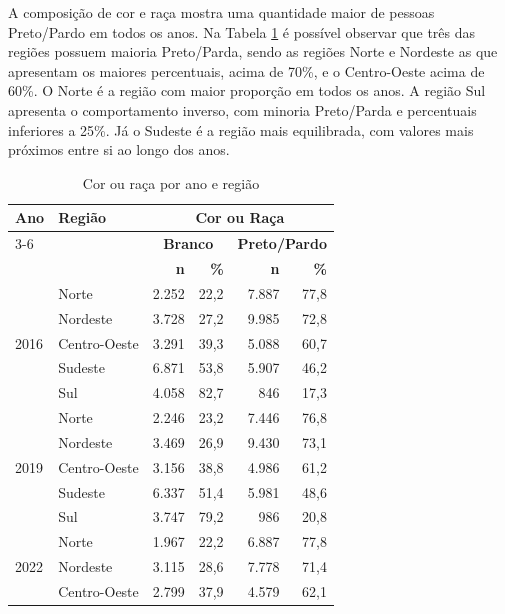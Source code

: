 \documentclass[12pt,a4paper,header]{abnt}
\begin{document}
\FloatBarrier
A composição de cor e raça mostra uma quantidade maior de pessoas Preto/Pardo em todos os anos. Na Tabela \ref{tab:cor_raça} é possível observar que três das regiões possuem maioria Preto/Parda, sendo as regiões Norte e Nordeste as que apresentam os maiores percentuais, acima de 70\%, e o Centro-Oeste acima de 60\%. O Norte é a região com maior proporção em todos os anos. A região Sul apresenta o comportamento inverso, com minoria Preto/Parda e percentuais inferiores a 25\%. Já o Sudeste é a região mais equilibrada, com valores mais próximos entre si ao longo dos anos.
\begin{table}[ht]
\centering
\caption{Cor ou raça por ano e região}
\label{tab:cor_raça}
\begin{tabular}{llrrrr}
\toprule
\multirow{3}{*}{\textbf{Ano}} & \multirow{3}{*}{\textbf{Região}} & \multicolumn{4}{c}{\textbf{Cor ou Raça}} \\
\cmidrule(lr){3-6}
& & \multicolumn{2}{c}{\textbf{Branco}} & \multicolumn{2}{c}{\textbf{Preto/Pardo}} \\
& & \textbf{n} & \textbf{\%} & \textbf{n} & \textbf{\%} \\
\midrule
\multirow{5}{*}{2016} & Norte        & 2.252 & 22,2 & 7.887 & 77,8 \\
                      & Nordeste     & 3.728 & 27,2 & 9.985 & 72,8 \\
                      & Centro-Oeste & 3.291 & 39,3 & 5.088 & 60,7 \\
                      & Sudeste      & 6.871 & 53,8 & 5.907 & 46,2 \\
                      & Sul          & 4.058 & 82,7 &  846 & 17,3 \\
\midrule
\multirow{5}{*}{2019} & Norte        & 2.246 & 23,2 & 7.446 & 76,8 \\
                      & Nordeste     & 3.469 & 26,9 & 9.430 & 73,1 \\
                      & Centro-Oeste & 3.156 & 38,8 & 4.986 & 61,2 \\
                      & Sudeste      & 6.337 & 51,4 & 5.981 & 48,6 \\
                      & Sul          & 3.747 & 79,2 &  986 & 20,8 \\
\midrule
\multirow{5}{*}{2022} & Norte        & 1.967 & 22,2 & 6.887 & 77,8 \\
                      & Nordeste     & 3.115 & 28,6 & 7.778 & 71,4 \\
                      & Centro-Oeste & 2.799 & 37,9 & 4.579 & 62,1 \\

\end{tabular}
\end{table}
\end{document}
